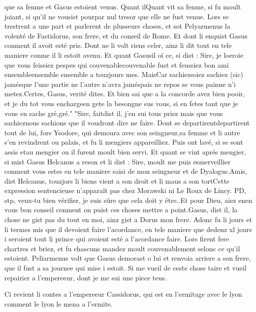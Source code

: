 \documentclass{article}
\begin{document}
\begin{pages}
   que sa fenme et Gasus 
      estoient venus. Quant ilQuant 
   vit sa fenme, si fu moult joiant, si qu’il ne vousist 
   pourpar nul tresor que elle ne fust venue. 
   Lors se trestrent a une part et parlerent de plusseurs choses, et sot Pelyarmenus 
   la volenté de Fastidorus, son frere, et du conseil de Rome. 
   Et dont li enquist Gasus conment il avoit esté pris. 
   Dont ne li volt riens celer, ainz li dit 
   tout en tele maniere conme il li estoit avenu. 
   Et quant Gasusil oï ce, si dist :
   Sire, je loeroie que vous feissiez pespes qui 
      couvenablecouvenable fust et feussiez bon ami 
      ensembleensemble ensemble a touzjours 
      mes. 
      MaisCar 
      sachiezsoiez sachiez (sic)
      jamésque l’une partie ne l’autre n’avra 
      jaméspais ne repos se vous painne n’i metez.Certes, Gasus, verité dites. Et bien sai que a la concorde avez bien pooir, 
      et je du tot vous enchargeen gete la besongne sus vous, 
      si en fetes tant que je vous en sache gré,gré." 
         "Sire, faitdist il, j'en sui tous priez 
      mais que vous sachieznous sachions que il voudront dire ne faire. \pend
\pstart Dont se departirentdepartirent tout 
   de lui, fors Ysodore, 
   qui demoura avec son seingneur,sa femme 
   et li autre s’en revindrent ou palais, 
   et fu li mengiers appareilliez. Puis ont lavé, si se sont assis 
   etau mengier ou il 
   furent moult bien servi. Et quant se vint aprés mengier, 
   si mist Gasus Helcanus a reson et li dist :
   Sire, moult me puis esmerveillier conment vous estes en tele maniere saisi de 
      mon seingneur et de Dyalogus.Amis, dist Helcanus, 
   touzjors li biens vient a son droit et li maus a son tortCette expression
   sentencieuse n'apparaît pas chez Morawski ni Le Roux de Lincy. PD, stp, veux-tu bien vérifier, je suis sûre que cela doit y être..Et pour Dieu, aiez enen vous 
      bon conseil conment on puist ces choses mettre a point.Gasus, dist il, la chose ne gist pas du tout en moi, ainz gist a 
   Dorus mon frere.
   Adonc fu li jours et li termes mis que il devoient faire l’acordance, en tele maniere que dedenz xl jours i seroient 
   tout li prince qui avoient esté a l’acordance faire. Lors firent fere chartres et briez, 
   et fu chascuns mandez moult couvenablement selonc ce qu’il estoient. 
   Peliarmenus volt que Gasus demorast o lui
   et renvoia arriere a son frere, que il fust a sa journee qui mise i estoit. 
   Si me vueil de ceste chose taire et vueil 
      repairier a l’empereeur, dont je me sui une piece teus.
 \pend
         
            Ci revient li contes a l’empereeur 
               Cassidorus, 
               qui est en l’ermitage avec 
                  le lyon
                  comment le lyon le mena a l'ermite.
            

\end{pages}
\end{document}
